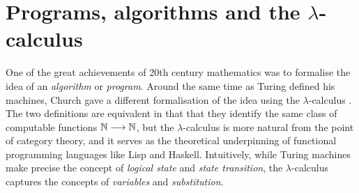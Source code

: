 \documentclass[english,letter paper,12pt,reqno]{article}
\theoremstyle{example}
\numberwithin{equation}{section}
\begin{document}



\section{Programs, algorithms and the $\lambda$-calculus}\label{section:lambda_calc}

One of the great achievements of 20th century mathematics was to formalise the idea of an \emph{algorithm} or \emph{program}. Around the same time as Turing defined his machines, Church gave a different formalisation of the idea using the $\lambda$-calculus \cite{church,selinger}. The two definitions are equivalent in that that they identify the same class of computable functions $\mathbb{N} \longrightarrow \mathbb{N}$, but the $\lambda$-calculus is more natural from the point of category theory, and it serves as the theoretical underpinning of functional programming languages like Lisp \cite{mccarthy} and Haskell. Intuitively, while Turing machines make precise the concept of \emph{logical state} and \emph{state transition}, the $\lambda$-calculus captures the concepts of \emph{variables} and \emph{substitution}. 
\end{document}
